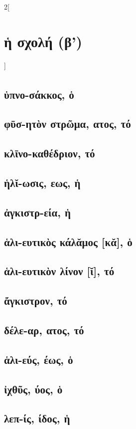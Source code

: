 \documentclass{book}
\begin{document}
\newpage
\begin{multicols}{2}[\section{ἡ σχολή (β')}] 
\subsection{ὑπνο-σάκκος\textsuperscript{\textdagger}, ὁ}
\subsection{φῡσ-ητὸν στρῶμα, ατος, τό}
\subsection{κλῑνο-καθέδριον, τό}
\subsection{ἡλῐ-ωσις, εως, ἡ}
\subsection{ἀγκιστρ-εία, ἡ}
\subsection{ἁλι-ευτικὸς κάλᾰμος [κᾰ], ὁ}
\subsection{ἁλι-ευτικὸν λίνον [ῐ], τό}
\subsection{ἄγκιστρον, τό}
\subsection{δέλε-αρ, ατος, τό}
\subsection{ἁλι-εύς, έως, ὁ}
\subsection{ἰχθῦς, ύος, ὁ}
\subsection{λεπ-ίς, ίδος, ἡ}
~
\end{multicols}
\end{document}
